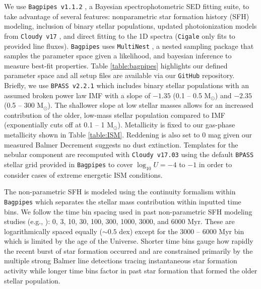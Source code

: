 \documentclass[twocolumn,tight,times,linenumbers]{aastex631}
\newcommand{\msol}{M$_\odot$}
\begin{document}
		We use \texttt{Bagpipes v1.1.2} \citep{Carnall2018}, a Bayesian spectrophotometric SED fitting suite, to take advantage of several features: nonparametric star formation history (SFH) modeling, inclusion of binary stellar populations, updated photoionization models from \texttt{Cloudy v17} \citep{Ferland2017}, and direct fitting to the 1D spectra (\texttt{Cigale} only fits to provided line fluxes). \texttt{Bagpipes} uses \texttt{MultiNest} \citep{Feroz2008,Feroz2009,Feroz2019}, a nested sampling package that samples the parameter space given a likelihood, and bayesian inference to measure best-fit properties. Table \ref{table:bagpipes} highlights our defined parameter space and all setup files are available via our \texttt{GitHub} repository. Briefly, we use \texttt{BPASS v2.2.1} \citep{Stanway2018} which includes binary stellar populations with an assumed broken power law IMF with a slope of $-1.35$ (0.1 -- 0.5 \msol) and $-2.35$ (0.5 -- 300 \msol). The shallower slope at low stellar masses allows for an increased contribution of the older, low-mass stellar population compared to \citet{Chabrier2003} IMF (exponentially cuts off at 0.1 -- 1 \msol). Metallicity is fixed to our gas-phase metallicity shown in Table \ref{table:ISM}. Reddening is also set to 0 mag given our measured Balmer Decrement suggests no dust extinction. Templates for the nebular component are recomputed with \texttt{Cloudy v17.03} using the default \texttt{BPASS} stellar grid provided in \texttt{Bagpipes} to cover $\log_{10} U = -4$ to $-1$ in order to consider cases of extreme energetic ISM conditions. 
		
		The non-parametric SFH is modeled using the \cite{Leja2019} continuity formalism within \texttt{Bagpipes} which separates the stellar mass contribution within inputted time bins. We follow the time bin spacing used in past non-parametric SFH modeling studies (e.g., \citealt{Leja2017,Leja2019,Tacchella2022,Tang2022}): 0, 3, 10, 30, 100, 300, 1000, 3000, and 6000 Myr. These are logarithmically spaced equally ($\sim 0.5$ dex) except for the 3000 -- 6000 Myr bin which is limited by the age of the Universe. Shorter time bins gauge how rapidly the recent burst of star formation occurred and are constrained primarily by the multiple strong Balmer line detections tracing instantaneous star formation activity while longer time bins factor in past star formation that formed the older stellar population.
		
	
		
\end{document}
